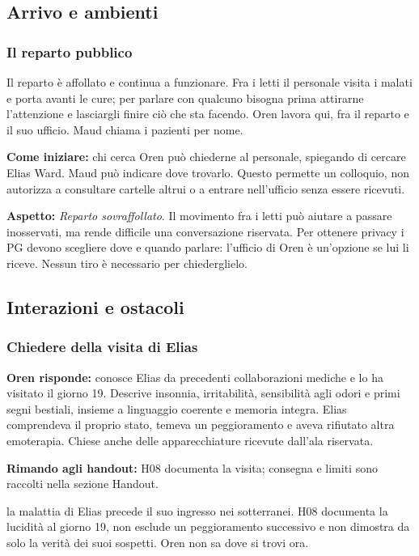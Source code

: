 \documentclass[11pt,a4paper]{article}
\newcommand{\aspect}[1]{\textit{\textcolor{blood}{#1}}}
\begin{document}
\subsection{Arrivo e ambienti}
\subsubsection{Il reparto pubblico}
\begin{readaloud}
Il reparto è affollato e continua a funzionare. Fra i letti il personale visita i malati e porta avanti le cure; per parlare con qualcuno bisogna prima attirarne l'attenzione e lasciargli finire ciò che sta facendo. Oren lavora qui, fra il reparto e il suo ufficio. Maud chiama i pazienti per nome.
\end{readaloud}

\textbf{Come iniziare:} chi cerca Oren può chiederne al personale, spiegando di cercare Elias Ward. Maud può indicare dove trovarlo. Questo permette un colloquio, non autorizza a consultare cartelle altrui o a entrare nell'ufficio senza essere ricevuti.

\textbf{Aspetto:} \aspect{Reparto sovraffollato}. Il movimento fra i letti può aiutare a passare inosservati, ma rende difficile una conversazione riservata. Per ottenere privacy i PG devono scegliere dove e quando parlare: l'ufficio di Oren è un'opzione se lui li riceve. Nessun tiro è necessario per chiederglielo.

\subsection{Interazioni e ostacoli}
\subsubsection{Chiedere della visita di Elias}
\textbf{Oren risponde:} conosce Elias da precedenti collaborazioni mediche e lo ha visitato il giorno 19. Descrive insonnia, irritabilità, sensibilità agli odori e primi segni bestiali, insieme a linguaggio coerente e memoria integra. Elias comprendeva il proprio stato, temeva un peggioramento e aveva rifiutato altra emoterapia. Chiese anche delle apparecchiature ricevute dall'ala riservata.



\textbf{Rimando agli handout:} H08 documenta la visita; consegna e limiti sono raccolti nella sezione Handout.

\begin{gmbox}
la malattia di Elias precede il suo ingresso nei sotterranei. H08 documenta la lucidità al giorno 19, non esclude un peggioramento successivo e non dimostra da solo la verità dei suoi sospetti. Oren non sa dove si trovi ora.
\end{gmbox}
\end{document}
